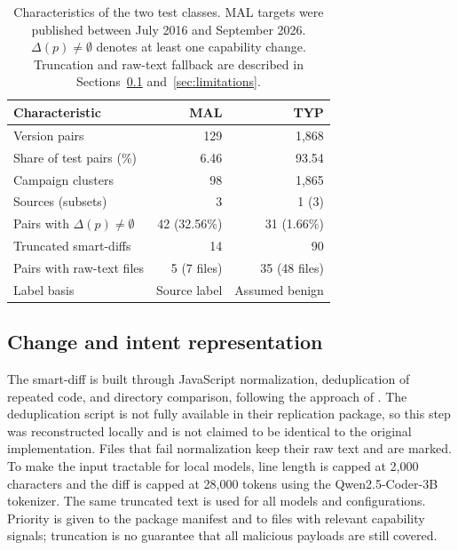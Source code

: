 \documentclass[a4paper,fleqn]{cas-dc}
\begin{document}
\begin{table}[t]
\centering\footnotesize
\setlength{\tabcolsep}{3pt}
\caption{Characteristics of the two test classes. MAL targets were published
between July 2016 and September 2026. $\Delta(p)\neq\emptyset$ denotes at least
one capability change. Truncation and raw-text fallback are described in
Sections~\ref{sec:repr} and~\ref{sec:limitations}.}
\label{tab:datachar}
\begin{tabular}{@{}lrr@{}}
\toprule
Characteristic & MAL & TYP \\
\midrule
Version pairs & 129 & 1,868 \\
Share of test pairs (\%) & 6.46 & 93.54 \\
Campaign clusters & 98 & 1,865 \\
Sources (subsets) & 3 & 1 (3) \\
Pairs with $\Delta(p)\neq\emptyset$ & 42 (32.56\%) & 31 (1.66\%) \\
Truncated smart-diffs & 14 & 90 \\
Pairs with raw-text files & 5 (7 files) & 35 (48 files) \\
Label basis & Source label & Assumed benign \\
\bottomrule
\end{tabular}
\end{table}

\subsection{Change and intent representation}\label{sec:repr}
The smart-diff is built through JavaScript normalization, deduplication of
repeated code, and directory comparison, following the approach of
\citet{wyss2025evaluating}. The deduplication script is not fully available in
their replication package, so this step was reconstructed locally and is not
claimed to be identical to the original implementation. Files that fail
normalization keep their raw text and are marked. To make the input tractable for
local models, line length is capped at 2,000 characters and the diff is capped at
28,000 tokens using the Qwen2.5-Coder-3B tokenizer. The same truncated text is
used for all models and configurations. Priority is given to the package manifest
and to files with relevant capability signals; truncation is no guarantee that
all malicious payloads are still covered.
\end{document}
